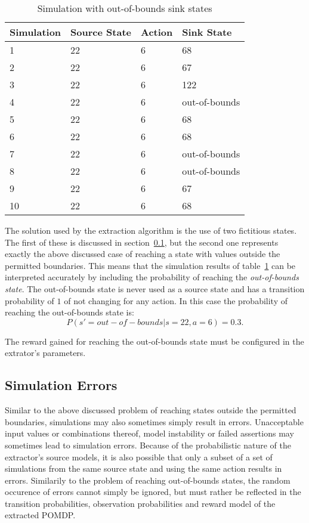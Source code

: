 \begin{table}
\begin{center}
    \begin{tabular}{ | l | l | l | l |}
    \hline
    Simulation & Source State & Action & Sink State \\ \hline
    1 & 22 & 6 & 68 \\ \hline
    2 & 22 & 6 & 67 \\ \hline
    3 & 22 & 6 & 122 \\ \hline
    4 & 22 & 6 & out-of-bounds \\ \hline
    5 & 22 & 6 & 68 \\ \hline
    6 & 22 & 6 & 68 \\ \hline
    7 & 22 & 6 & out-of-bounds \\ \hline
    8 & 22 & 6 & out-of-bounds \\ \hline
    9 & 22 & 6 & 67 \\ \hline
    10 & 22 & 6 & 68 \\ \hline

    \end{tabular}
\caption{Simulation with out-of-bounds sink states}
\label{outboundssim}
\end{center}
\end{table}

The solution used by the extraction algorithm is the use of two fictitious states. The first of these is discussed in section~\ref{subsec:simerrors}, but the second one represents exactly the above discussed case of reaching a state with values outside the permitted boundaries. This means that the simulation results of table~\ref{outboundssim} can be interpreted accurately by including the probability of reaching the \textit{out-of-bounds state}. The out-of-bounds state is never used as a source state and has a transition probability of $1$ of not changing for any action. In this case the probability of reaching the out-of-bounds state is:
\[
P(s' = out-of-bounds|s=22,a=6) = 0.3.
\]

The reward gained for reaching the out-of-bounds state must be configured in the extrator's parameters.


\subsection{Simulation Errors}
\label{subsec:simerrors}

Similar to the above discussed problem of reaching states outside the permitted boundaries, simulations may also sometimes simply result in errors. Unacceptable input values or combinations thereof, model instability or failed assertions may sometimes lead to simulation errors. Because of the probabilistic nature of the extractor's source models, it is also possible that only a subset of a set of simulations from the same source state and using the same action results in errors. Similarily to the problem of reaching out-of-bounds states, the random occurence of errors cannot simply be ignored, but must rather be reflected in the transition probabilities, observation probabilities and reward model of the extracted POMDP.

